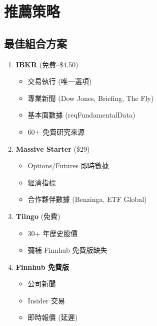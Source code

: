 \documentclass[11pt,a4paper]{article}
\begin{document}
\newpage
\section{推薦策略}

\subsection{最佳組合方案}

\begin{tcolorbox}[colback=successgreen!5,colframe=successgreen,title={\textbf{成本效益最佳組合 (月費約 \$33.50)}}]
\begin{enumerate}[leftmargin=*]
    \item \textbf{IBKR} (免費--\$4.50)
    \begin{itemize}
        \item 交易執行 (唯一選項)
        \item 專業新聞 (Dow Jones, Briefing, The Fly)
        \item 基本面數據 (reqFundamentalData)
        \item 60+ 免費研究來源
    \end{itemize}

    \item \textbf{Massive Starter} (\$29)
    \begin{itemize}
        \item Options/Futures 即時數據
        \item 經濟指標
        \item 合作夥伴數據 (Benzinga, ETF Global)
    \end{itemize}

    \item \textbf{Tiingo} (免費)
    \begin{itemize}
        \item 30+ 年歷史股價
        \item 彌補 Finnhub 免費版缺失
    \end{itemize}

    \item \textbf{Finnhub 免費版}
    \begin{itemize}
        \item 公司新聞
        \item Insider 交易
        \item 即時報價 (延遲)
    \end{itemize}
\end{enumerate}
\end{tcolorbox}
\end{document}

